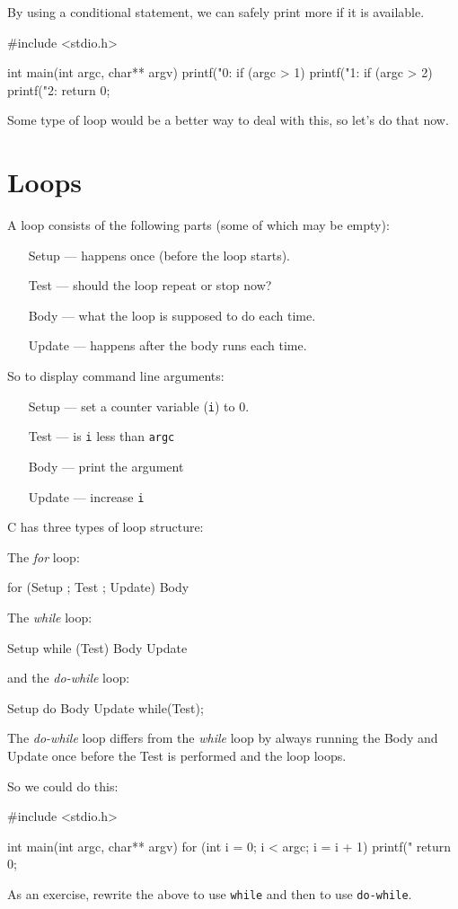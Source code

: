 By using a conditional statement, we can safely print more if it is available.
\begin{codeblock}
#include <stdio.h>

int main(int argc, char** argv) {
    printf("0: %
    if (argc > 1) {
      printf("1: %
    }
    if (argc > 2) {
      printf("2: %
    }
    return 0;
}
\end{codeblock}
Some type of loop would be a better way to deal with this, so let's do that now.

\section{Loops}
A loop consists of the following parts (some of which may be empty):
\begin{itemize}
 \item [Setup] --- happens once (before the loop starts).
 \item [Test]  --- should the loop repeat or stop now?
 \item [Body]  --- what the loop is supposed to do each time.
 \item [Update] --- happens after the body runs each time.
\end{itemize}

So to display command line arguments:
\begin{itemize}
 \item [Setup] --- set a counter variable (\texttt{i}) to 0.
 \item [Test]  --- is \texttt{i} less than \texttt{argc}
 \item [Body]  --- print the argument
 \item [Update] --- increase \texttt{i}
\end{itemize}

C has three types of loop structure:

The \emph{for} loop:
\begin{codeblock}
for (Setup ; Test ; Update) {
    Body
}
\end{codeblock}

The \emph{while} loop:
\begin{codeblock}
Setup
while (Test) {
    Body
    Update
}
\end{codeblock}

and the \emph{do-while} loop:
\begin{codeblock}
Setup
do {
    Body
    Update
} while(Test);
\end{codeblock}

The \emph{do-while} loop differs from the \emph{while} loop by always running the Body and Update once before the Test is performed and the loop loops.

So we could do this:
\begin{codeblock}
#include <stdio.h>

int main(int argc, char** argv) {
    for (int i = 0; i < argc; i = i + 1) {
        printf("%
    }
    return 0;
}
\end{codeblock}

As an exercise, rewrite the above to use \texttt{while} and then to use \texttt{do-while}.
